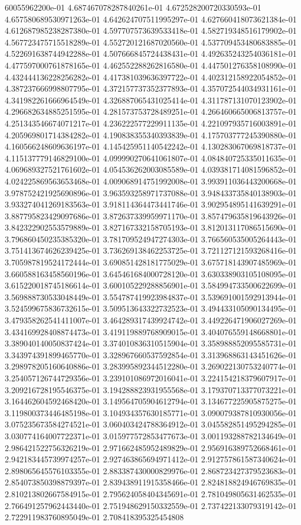 60055962200e-01	4.687467078287840261e-01	4.672528200720330593e-01	4.657580689530971263e-01	4.642624707511995297e-01	4.627660418073621384e-01	4.612687985238287380e-01	4.597707573639533418e-01	4.582719348516179902e-01	4.567723475715518289e-01	4.552720121687020560e-01	4.537709453480683885e-01	4.522691638744942288e-01	4.507666845724438431e-01	4.492635243254036181e-01	4.477597000761878165e-01	4.462552288262816580e-01	4.447501276358108990e-01	4.432444136228256282e-01	4.417381039636397722e-01	4.402312158922054852e-01	4.387237666998807795e-01	4.372157737352377893e-01	4.357072544034931161e-01	4.341982261666964549e-01	4.326887065431025414e-01	4.311787131070123902e-01	4.296682634885251595e-01	4.281573753728489251e-01	4.266460665006813757e-01	4.251343546674071217e-01	4.236222577229911135e-01	4.221097935716003891e-01	4.205969801714384282e-01	4.190838355340393839e-01	4.175703777245390880e-01	4.160566248609636197e-01	4.145425951140542242e-01	4.130283067069818737e-01	4.115137779146829100e-01	4.099990270641061807e-01	4.084840725335011635e-01	4.069689327521761602e-01	4.054536262003085589e-01	4.039381714081596852e-01	4.024225869563653468e-01	4.009068914751992008e-01	3.993911036443200668e-01	3.978752421925690896e-01	3.963593258971737088e-01	3.948433735840138903e-01	3.933274041269183563e-01	3.918114364473441746e-01	3.902954895141639291e-01	3.887795823429097686e-01	3.872637339959971170e-01	3.857479635819643926e-01	3.842322902553579889e-01	3.827167332158705193e-01	3.812013117086515690e-01	3.796860450235385320e-01	3.781709524947274303e-01	3.766560535005264443e-01	3.751413674626239425e-01	3.736269138462253725e-01	3.721127121593268416e-01	3.705987819524172444e-01	3.690851428181775029e-01	3.675718143907485969e-01	3.660588163458560196e-01	3.645461684000728120e-01	3.630338903105108095e-01	3.615220018745186614e-01	3.600105229288856901e-01	3.584994733500622699e-01	3.569888730533048449e-01	3.554787419923984837e-01	3.539691001592913944e-01	3.524599675836732615e-01	3.509513643322732523e-01	3.494433105090134495e-01	3.479358262541411007e-01	3.464289317439924742e-01	3.449226471906027269e-01	3.434169928408874473e-01	3.419119889768909015e-01	3.404076559148668801e-01	3.389040140050837424e-01	3.374010836310515904e-01	3.358988852095585731e-01	3.343974391899465770e-01	3.328967660537592854e-01	3.313968863143451626e-01	3.298978205160640886e-01	3.283995892344512280e-01	3.269022130753240774e-01	3.254057126744729356e-01	3.239101086972016041e-01	3.224154218379607917e-01	3.209216728195546375e-01	3.194288823931955568e-01	3.179370713377073221e-01	3.164462604592468420e-01	3.149564705904612794e-01	3.134677225905875275e-01	3.119800373446485198e-01	3.104934357630185771e-01	3.090079387810930056e-01	3.075235673584274521e-01	3.060403424788364912e-01	3.045582851495294285e-01	3.030774164007722371e-01	3.015977572853477673e-01	3.001193288782134649e-01	2.986421522756326219e-01	2.971662485952489829e-01	2.956916389752668461e-01	2.942183445739974257e-01	2.927463865694971412e-01	2.912757861587340624e-01	2.898065645576103355e-01	2.883387430000829976e-01	2.868723427379523683e-01	2.854073850398879397e-01	2.839438911915358466e-01	2.824818824946769835e-01	2.810213802667584915e-01	2.795624058404345691e-01	2.781049805631462535e-01	2.766491257962443440e-01	2.751948629150332559e-01	2.737422133079319142e-01	2.722911983760895049e-01	2.708418395325454808